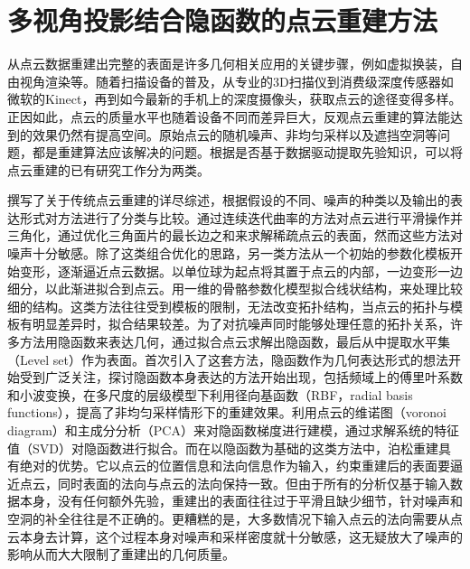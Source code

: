 \chapter{多视角投影结合隐函数的点云重建方法}
从点云数据重建出完整的表面是许多几何相关应用的关键步骤，例如虚拟换装，自由视角渲染等。随着扫描设备的普及，从专业的3D扫描仪到消费级深度传感器如微软的Kinect，再到如今最新的手机上的深度摄像头，获取点云的途径变得多样。正因如此，点云的质量水平也随着设备不同而差异巨大，反观点云重建的算法能达到的效果仍然有提高空间。原始点云的随机噪声、非均匀采样以及遮挡空洞等问题，都是重建算法应该解决的问题。根据是否基于数据驱动提取先验知识，可以将点云重建的已有研究工作分为两类。

\citet{berger17}撰写了关于传统点云重建的详尽综述，根据假设的不同、噪声的种类以及输出的表达形式对方法进行了分类与比较。\citet{digne11}通过连续迭代曲率的方法对点云进行平滑操作并三角化，\citet{OHRHALLINGER2013645}通过优化三角面片的最长边之和来求解稀疏点云的表面，然而这些方法对噪声十分敏感。除了这类组合优化的思路，另一类方法从一个初始的参数化模板开始变形，逐渐逼近点云数据。\citet{sharf06}以单位球为起点将其置于点云的内部，一边变形一边细分，以此渐进拟合到点云。\citet{li10}用一维的骨骼参数化模型拟合线状结构，来处理比较细的结构。这类方法往往受到模板的限制，无法改变拓扑结构，当点云的拓扑与模板有明显差异时，拟合结果较差。为了对抗噪声同时能够处理任意的拓扑关系，许多方法用隐函数来表达几何，通过拟合点云求解出隐函数，最后从中提取水平集（Level set）作为表面。\citet{hoppe92}首次引入了这套方法，隐函数作为几何表达形式的想法开始受到广泛关注，探讨隐函数本身表达的方法开始出现，包括频域上的傅里叶系数\citet{kazhdan05}和小波变换\citet{manson08}，\citet{ohtake05}在多尺度的层级模型下利用径向基函数（RBF，radial basis functions），提高了非均匀采样情形下的重建效果。\citet{alliez07}利用点云的维诺图（voronoi diagram）和主成分分析（PCA）来对隐函数梯度进行建模，通过求解系统的特征值（SVD）对隐函数进行拟合。而在以隐函数为基础的这类方法中，泊松重建\citep{kazhdan2013, kazhdan2006}具有绝对的优势。它以点云的位置信息和法向信息作为输入，约束重建后的表面要逼近点云，同时表面的法向与点云的法向保持一致。但由于所有的分析仅基于输入数据本身，没有任何额外先验，重建出的表面往往过于平滑且缺少细节，针对噪声和空洞的补全往往是不正确的。更糟糕的是，大多数情况下输入点云的法向需要从点云本身去计算，这个过程本身对噪声和采样密度就十分敏感，这无疑放大了噪声的影响从而大大限制了重建出的几何质量。

